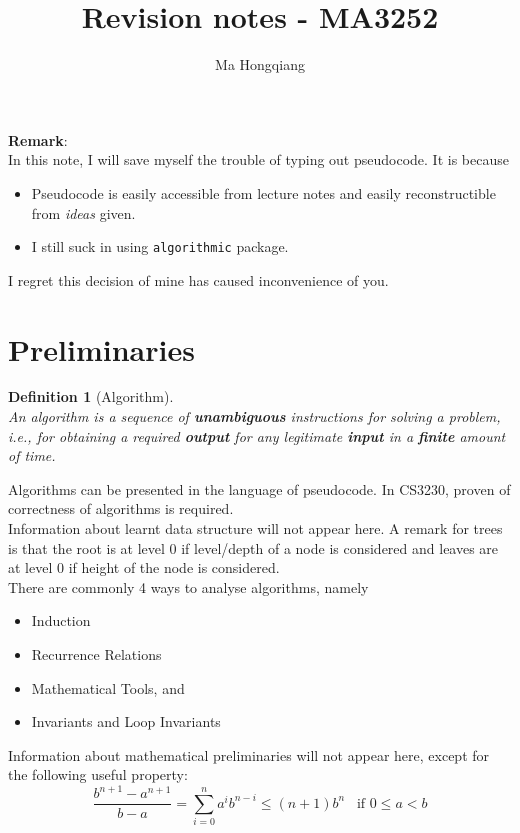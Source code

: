 \documentclass[12pt]{article}
\newtheorem{definition}{Definition}[section]
\theoremstyle{definition}
\begin{document}
\title{Revision notes - MA3252}
\author{Ma Hongqiang}
\maketitle
\tableofcontents\vspace{5cm}
\textbf{Remark}:\\
In this note, I will save myself the trouble of typing out pseudocode. It is because
\begin{itemize}
  \item Pseudocode is easily accessible from lecture notes and easily reconstructible from \textit{ideas} given.
  \item I still suck in using \texttt{algorithmic} package.
\end{itemize}
I regret this decision of mine has caused inconvenience of you.
\clearpage
\section{Preliminaries}
\begin{definition}[Algorithm]
\hfill\\\normalfont An algorithm is a sequence of \textbf{unambiguous} instructions for solving a problem, i.e., for obtaining a required \textbf{output} for any legitimate \textbf{input} in a \textbf{finite} amount of time.
\end{definition}
Algorithms can be presented in the language of pseudocode. In CS3230, proven of correctness of algorithms is required.\\
Information about learnt data structure will not appear here. A remark for trees is that the root is at level 0 if level/depth of a node is considered and leaves are at level 0 if height of the node is considered.\\
There are commonly 4 ways to analyse algorithms, namely
\begin{itemize}
  \item Induction
  \item Recurrence Relations
  \item Mathematical Tools, and
  \item Invariants and Loop Invariants
\end{itemize}
Information about mathematical preliminaries will not appear here, except for the following useful property:
\[
\frac{b^{n+1}-a^{n+1}}{b-a}=\sum_{i=0}^n a^ib^{n-i}\leq (n+1)b^n\;\;\;\text{if }0\leq a<b
\]
\end{document}
